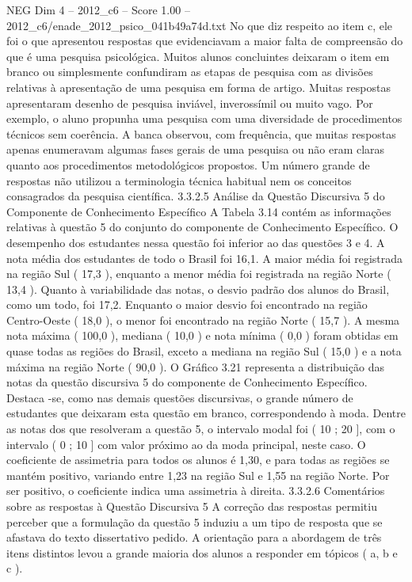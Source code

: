 \begin{textsample}{NEG Dim 4 – 2012\_c6 – Score 1.00 – 2012\_c6/enade\_2012\_psico\_041b49a74d.txt}
No que diz respeito ao item c, ele foi o que apresentou respostas que evidenciavam a maior falta de compreensão do que é uma pesquisa psicológica.
Muitos alunos concluintes deixaram o item em branco ou simplesmente confundiram as etapas de pesquisa com as divisões relativas à apresentação de uma pesquisa em forma de artigo.
Muitas respostas apresentaram desenho de pesquisa inviável, inverossímil ou muito vago.
Por exemplo, o aluno propunha uma pesquisa com uma diversidade de procedimentos técnicos sem coerência.
A banca observou, com frequência, que muitas respostas apenas enumeravam algumas fases gerais de uma pesquisa ou não eram claras quanto aos procedimentos metodológicos propostos.
Um número grande de respostas não utilizou a terminologia técnica habitual nem os conceitos consagrados da pesquisa científica. 3.3.2.5 Análise da Questão Discursiva 5 do Componente de Conhecimento Específico A Tabela 3.14 contém as informações relativas à questão 5 do conjunto do componente de Conhecimento Específico.
O desempenho dos estudantes nessa questão foi inferior ao das questões 3 e 4.
A nota média dos estudantes de todo o Brasil foi 16,1.
A maior média foi registrada na região Sul ( 17,3 ), enquanto a menor média foi registrada na região Norte ( 13,4 ).
Quanto à variabilidade das notas, o desvio padrão dos alunos do Brasil, como um todo, foi 17,2.
Enquanto o maior desvio foi encontrado na região Centro-Oeste ( 18,0 ), o menor foi encontrado na região Norte ( 15,7 ).
A mesma nota máxima ( 100,0 ), mediana ( 10,0 ) e nota mínima ( 0,0 ) foram obtidas em quase todas as regiões do Brasil, exceto a mediana na região Sul ( 15,0 ) e a nota máxima na região Norte ( 90,0 ).
O Gráfico 3.21 representa a distribuição das notas da questão discursiva 5 do componente de Conhecimento Específico.
Destaca -se, como nas demais questões discursivas, o grande número de estudantes que deixaram esta questão em branco, correspondendo à moda.
Dentre as notas dos que resolveram a questão 5, o intervalo modal foi ( 10 ; 20 ], com o intervalo ( 0 ; 10 ] com valor próximo ao da moda principal, neste caso.
O coeficiente de assimetria para todos os alunos é 1,30, e para todas as regiões se mantém positivo, variando entre 1,23 na região Sul e 1,55 na região Norte.
Por ser positivo, o coeficiente indica uma assimetria à direita. 3.3.2.6 Comentários sobre as respostas à Questão Discursiva 5 A correção das respostas permitiu perceber que a formulação da questão 5 induziu a um tipo de resposta que se afastava do texto dissertativo pedido.
A orientação para a abordagem de três itens distintos levou a grande maioria dos alunos a responder em tópicos ( a, b e c ).

\end{textsample}
